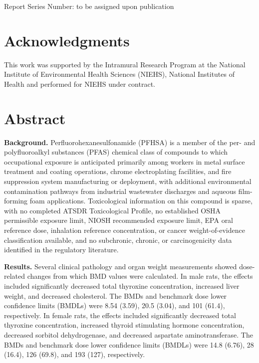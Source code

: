 Report Series Number: to be assigned upon publication

\section{Acknowledgments}

This work was supported by the Intramural Research Program at the National Institute of Environmental Health Sciences (NIEHS), National Institutes of Health and performed for NIEHS under contract.

\section{Abstract}

\noindent\textbf{Background.} Perfluorohexanesulfonamide (PFHSA) is a member of the per- and polyfluoroalkyl substances (PFAS) chemical class of compounds to which occupational exposure is anticipated primarily among workers in metal surface treatment and coating operations, chrome electroplating facilities, and fire suppression system manufacturing or deployment, with additional environmental contamination pathways from industrial wastewater discharges and aqueous film-forming foam applications. Toxicological information on this compound is sparse, with no completed ATSDR Toxicological Profile, no established OSHA permissible exposure limit, NIOSH recommended exposure limit, EPA oral reference dose, inhalation reference concentration, or cancer weight-of-evidence classification available, and no subchronic, chronic, or carcinogenicity data identified in the regulatory literature.

\noindent\textbf{Results.} Several clinical pathology and organ weight measurements showed dose-related changes from which BMD values were calculated. In male rats, the effects included significantly decreased total thyroxine concentration, increased liver weight, and decreased cholesterol. The BMDs and benchmark dose lower confidence limits (BMDLs) were 8.54 (3.59), 20.5 (3.04), and 101 (61.4), respectively. In female rats, the effects included significantly decreased total thyroxine concentration, increased thyroid stimulating hormone concentration, decreased sorbitol dehydrogenase, and decreased aspartate aminotransferase. The BMDs and benchmark dose lower confidence limits (BMDLs) were 14.8 (6.76), 28 (16.4), 126 (69.8), and 193 (127), respectively.


